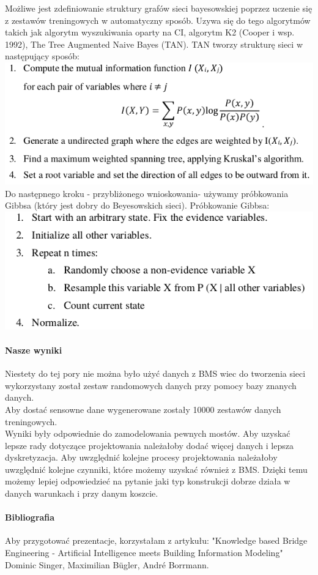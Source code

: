 \documentclass[11pt,a4paper]{article}
\begin{document}
Możliwe jest zdefiniowanie struktury grafów sieci bayesowskiej poprzez uczenie się z zestawów treningowych w automatyczny sposób. Uzywa się do tego algorytmów takich jak algorytm wyszukiwania oparty na CI, algorytm K2 (Cooper i wsp. 1992), The Tree Augmented Naive Bayes (TAN). TAN tworzy strukturę sieci w następujący sposób:\\
\includegraphics[scale=0.5]{TAN.png}\\
Do następnego kroku - przybliżonego wnioskowania- używamy próbkowania Gibbsa (który jest dobry do Beyesowskich sieci).
Próbkowanie Gibbsa:\\
\includegraphics[scale=0.5]{Gibs.png} 

\paragraph{Nasze wyniki}
Niestety do tej pory nie można było użyć danych z BMS wiec do tworzenia sieci wykorzystany został zestaw randomowych danych   przy pomocy bazy znanych danych. \\
Aby dostać sensowne dane wygenerowane zostały 10000 zestawów danych treningowych. \\
Wyniki były odpowiednie do zamodelowania pewnych mostów. Aby uzyskać lepsze rady dotyczące projektowania należałoby dodać więcej danych i lepsza dyskretyzacja. Aby  uwzględnić kolejne procesy projektowania należałoby uwzględnić kolejne czynniki, które możemy uzyskać również z BMS. Dzięki temu możemy lepiej odpowiedzieć na pytanie jaki typ konstrukcji dobrze działa w danych warunkach i przy danym koszcie.
\paragraph{Bibliografia}
Aby przygotować prezentacje, korzystałam z artykułu: "Knowledge based Bridge Engineering - Artificial Intelligence meets Building Information Modeling" Dominic Singer, Maximilian Bügler, André Borrmann. 
\end{document}
